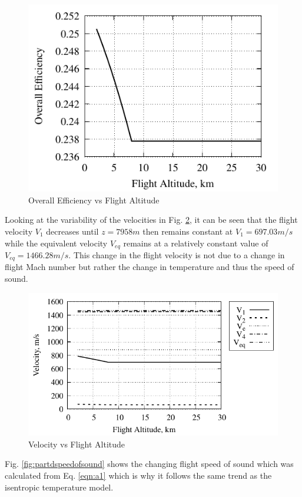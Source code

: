 \documentclass[conf]{new-aiaa} %
\begin{document}
\begin{figure}[H] %
    \centering
    \includegraphics[]{media/performance_parameter_files/part_d_eta_o.pdf}
    \caption{\label{fig:partdetao}Overall Efficiency vs Flight Altitude}
\end{figure}
Looking at the variability of the velocities in Fig. \ref{fig:partdvelocity}, it can be seen that the flight velocity $V_1$ decreases until $z=7958m$ then remains constant at $V_1=697.03m/s$ while the equivalent velocity $V_{eq}$ remains at a relatively constant value of $V_{eq}=1466.28m/s$. This change in the flight velocity is not due to a change in flight Mach number but rather the change in temperature and thus the speed of sound.

\begin{figure}[H] %
    \centering
    \includegraphics[]{media/performance_parameter_files/part_d_velocity.pdf}
    \caption{\label{fig:partdvelocity}Velocity vs Flight Altitude}
\end{figure}
Fig. \ref{fig:partdspeedofsound} shows the changing flight speed of sound which was calculated from Eq. \ref{eqn:a1} which is why it follows the same trend as the isentropic temperature model.
\end{document}
